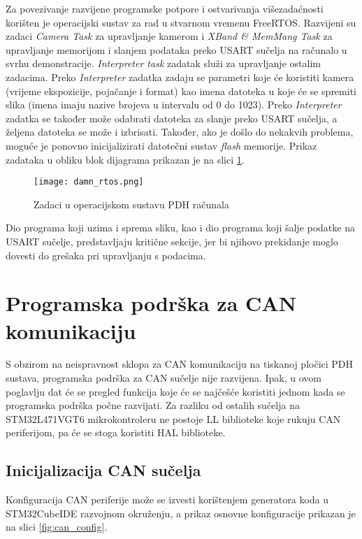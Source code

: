 Za povezivanje razvijene programske potpore i ostvarivanja višezadaćnosti korišten je operacijski sustav za rad u stvarnom vremenu FreeRTOS. Razvijeni su zadaci \textit{Camera Task} za upravljanje kamerom i \textit{XBand \& MemMang Task} za upravljanje memorijom i slanjem podataka preko USART sučelja na računalo u svrhu demonstracije. \textit{Interpreter task} zadatak služi za upravljanje ostalim zadacima. Preko \textit{Interpreter} zadatka zadaju se parametri koje će koristiti kamera (vrijeme ekspozicije, pojačanje i format) kao imena datoteka u koje će se spremiti slika (imena imaju nazive brojeva u intervalu od 0 do 1023). Preko \textit{Interpreter} zadatka se također može odabrati datoteka za slanje preko USART sučelja, a željena datoteka se može i izbrisati. Također, ako je došlo do nekakvih problema, moguće je ponovno inicijalizirati datotečni sustav \textit{flash} memorije.
Prikaz zadataka u obliku blok dijagrama prikazan je na slici \ref{fig:tasks}.

\begin{figure}[H]
	\centering
	\texttt{[image: damn\_rtos.png]}
	\caption{Zadaci u operacijskom sustavu PDH računala}
	\label{fig:tasks}
\end{figure}

\noindent Dio programa koji uzima i sprema sliku, kao i dio programa koji šalje podatke na USART sučelje, predstavljaju kritične sekcije, jer bi njihovo prekidanje moglo dovesti do grešaka pri upravljanju s podacima.

\section{Programska podrška za CAN komunikaciju}

S obzirom na neispravnost sklopa za CAN komunikaciju na tiskanoj pločici PDH sustava, programska podrška za CAN sučelje nije razvijena. Ipak, u ovom poglavlju dat će se pregled funkcija koje će se najčešće koristiti jednom kada se programska podrška počne razvijati. Za razliku od ostalih sučelja na STM32L471VGT6 mikrokontroleru ne postoje LL biblioteke koje rukuju CAN periferijom, pa će se stoga koristiti HAL biblioteke.

\subsection{Inicijalizacija CAN sučelja}

Konfiguracija CAN periferije može se izvesti korištenjem generatora koda u \\STM32CubeIDE razvojnom okruženju, a prikaz osnovne konfiguracije prikazan je na slici \ref{fig:can_config}.

